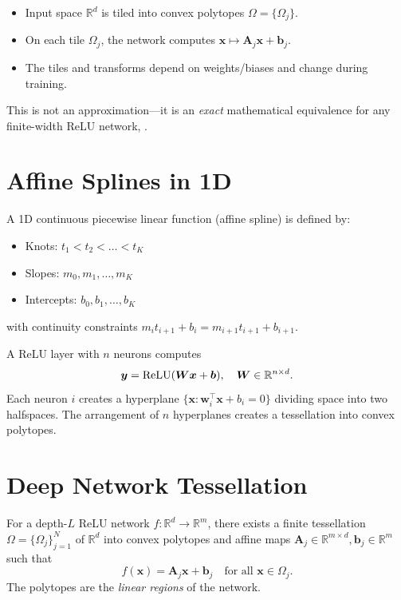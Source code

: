 \begin{itemize}
    \item Input space $\mathbb{R}^d$ is tiled into convex polytopes $\Omega = \{\Omega_j\}$.
    \item On each tile $\Omega_j$, the network computes $\bm{x} \mapsto \bm{A}_j \bm{x} + \bm{b}_j$.
    \item The tiles and transforms depend on weights/biases and change during training.
\end{itemize}

This is not an approximation---it is an \emph{exact} mathematical equivalence for any finite-width ReLU network, \cite{balestriero2025geometry}.

\section{Affine Splines in 1D}
\label{sec:dl:1d}

A 1D continuous piecewise linear function (affine spline) is defined by:
\begin{itemize}
    \item Knots: $t_1 < t_2 < \dots < t_K$
    \item Slopes: $m_0, m_1, \dots, m_K$
    \item Intercepts: $b_0, b_1, \dots, b_K$
\end{itemize}
with continuity constraints $m_i t_{i+1} + b_i = m_{i+1} t_{i+1} + b_{i+1}$.

A ReLU layer with $n$ neurons computes \cite{balestriero2025geometry}
\[
\bm{y} = \operatorname{ReLU}(\bm{W}\bm{x} + \bm{b}), \quad \bm{W} \in \mathbb{R}^{n \times d}.
\]
Each neuron $i$ creates a hyperplane $\{\bm{x} : \bm{w}_i^\top \bm{x} + b_i = 0\}$ dividing space into two halfspaces. The arrangement of $n$ hyperplanes creates a tessellation into convex polytopes.

\section{Deep Network Tessellation}
\label{sec:dl:tess}

\begin{theorem}[Deep Network = Affine Spline]
\label{thm:dl:affine_spline}
For a depth-$L$ ReLU network $f: \mathbb{R}^d \to \mathbb{R}^m$, there exists a finite tessellation $\Omega = \{\Omega_j\}_{j=1}^N$ of $\mathbb{R}^d$ into convex polytopes and affine maps $\bm{A}_j \in \mathbb{R}^{m \times d}, \bm{b}_j \in \mathbb{R}^m$ such that \cite{balestriero2025geometry}
\[
f(\bm{x}) = \bm{A}_j \bm{x} + \bm{b}_j \quad \text{for all } \bm{x} \in \Omega_j.
\]
The polytopes are the \emph{linear regions} of the network.
\end{theorem}

